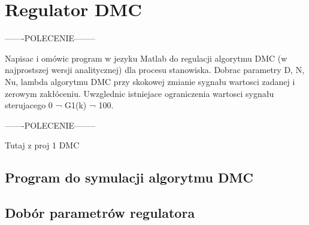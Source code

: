 \section{Regulator DMC}
\label{lab:zad4}


-------POLECENIE--------

Napisac i omówic program w jezyku Matlab do regulacji algorytmu DMC (w najprostszej
wersji analitycznej) dla procesu stanowiska. Dobrac parametry D, N, Nu, lambda
algorytmu DMC przy skokowej zmianie sygnału wartosci zadanej i zerowym zakłóceniu.
Uwzglednic istniejace ograniczenia wartosci sygnału sterujacego 0 ¬ G1(k) ¬ 100.

-------POLECENIE--------

Tutaj z proj 1 DMC

\subsection{Program do symulacji algorytmu DMC}
\label{lab:zad4:program}

\subsection{Dobór parametrów regulatora}
\label{lab:zad4:parametry}
